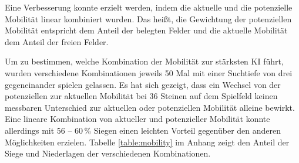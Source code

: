 Eine Verbesserung konnte erzielt werden, indem die aktuelle und die potenzielle Mobilität linear kombiniert wurden.
Das heißt, die Gewichtung der potenziellen Mobilität entspricht dem Anteil der belegten Felder und die aktuelle Mobilität
dem Anteil der freien Felder.

Um zu bestimmen, welche Kombination der Mobilität zur stärksten KI führt, wurden verschiedene Kombinationen jeweils 50
Mal mit einer Suchtiefe von drei gegeneinander spielen gelassen. Es hat sich gezeigt, dass ein Wechsel von der potenziellen zur aktuellen Mobilität bei 36 Steinen auf dem Spielfeld keinen messbaren Unterschied zur aktuellen oder potenziellen Mobilität alleine bewirkt. Eine lineare Kombination von aktueller und potenzieller Mobilität konnte allerdings mit 56 – 60\,\% Siegen einen leichten Vorteil gegenüber den anderen Möglichkeiten erzielen.
Tabelle \ref{table:mobility} im Anhang zeigt den Anteil der Siege und Niederlagen der verschiedenen Kombinationen.
